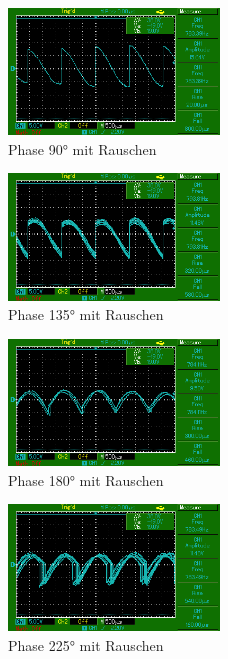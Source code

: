 \begin{figure}
    \centering
    \includegraphics[width=0.5\textwidth]{bilder/MAP009.png}
    \caption{Phase 90° mit Rauschen}        
    \label{fig:MAP009}
\end{figure}

\begin{figure}
    \centering
    \includegraphics[width=0.5\textwidth]{bilder/MAP010.png}
    \caption{Phase 135° mit Rauschen}        
    \label{fig:MAP010}
\end{figure}

\begin{figure}
    \centering
    \includegraphics[width=0.5\textwidth]{bilder/MAP011.png}
    \caption{Phase 180° mit Rauschen}        
    \label{fig:MAP011}
\end{figure}

\begin{figure}
    \centering
    \includegraphics[width=0.5\textwidth]{bilder/MAP012.png}
    \caption{Phase 225° mit Rauschen}        
    \label{fig:MAP012}
\end{figure}

